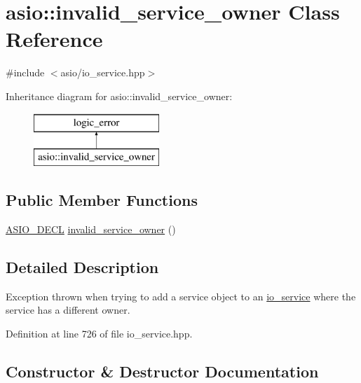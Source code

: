 \hypertarget{classasio_1_1invalid__service__owner}{}\section{asio\+:\+:invalid\+\_\+service\+\_\+owner Class Reference}
\label{classasio_1_1invalid__service__owner}


{\ttfamily \#include $<$asio/io\+\_\+service.\+hpp$>$}

Inheritance diagram for asio\+:\+:invalid\+\_\+service\+\_\+owner\+:\begin{figure}[H]
\begin{center}
\leavevmode
\includegraphics[height=2.000000cm]{classasio_1_1invalid__service__owner}
\end{center}
\end{figure}
\subsection*{Public Member Functions}
\begin{DoxyCompactItemize}
\item 
\hyperlink{config_8hpp_ab54d01ea04afeb9a8b39cfac467656b7}{A\+S\+I\+O\+\_\+\+D\+E\+C\+L} \hyperlink{classasio_1_1invalid__service__owner_a3719b084346e471515b60c24804fe2c7}{invalid\+\_\+service\+\_\+owner} ()
\end{DoxyCompactItemize}


\subsection{Detailed Description}
Exception thrown when trying to add a service object to an \hyperlink{classasio_1_1io__service}{io\+\_\+service} where the service has a different owner. 

Definition at line 726 of file io\+\_\+service.\+hpp.



\subsection{Constructor \& Destructor Documentation}
\hypertarget{classasio_1_1invalid__service__owner_a3719b084346e471515b60c24804fe2c7}{}

